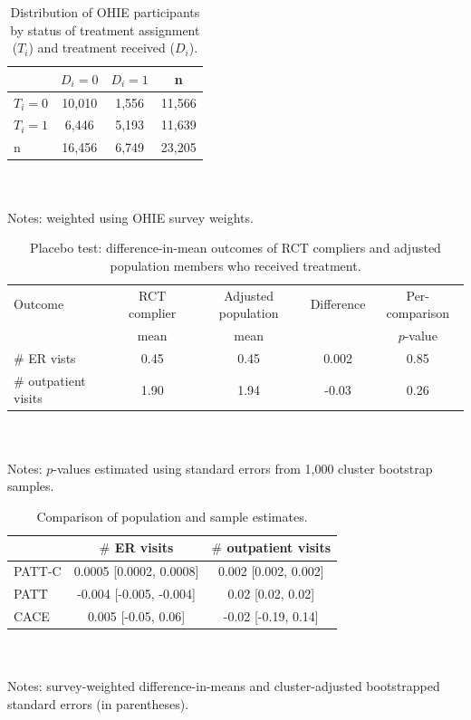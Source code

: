 \documentclass[hidelinks,12pt]{article}
\begin{document}
\begin{appendices}
\begin{table}[h]
	\caption{Distribution of OHIE participants by status of treatment assignment ($T_i$) and treatment received ($D_i$).\label{ohie-status}} 
	\begin{tabular}{@{}lccc@{}}
		\toprule
		& $D_i = 0$ & $D_i = 1$ & n      \\ \midrule
		$T_i = 0$ & 10,010    & 1,556     & 11,566 \\
		$T_i = 1$ & 6,446     & 5,193     & 11,639 \\
		n         & 16,456    & 6,749     & 23,205 \\ \bottomrule
	\end{tabular}\\ \\
	\footnotesize{Notes: weighted using OHIE survey weights.}
\end{table}

\begin{table}[h]
		\caption{Placebo test: difference-in-mean outcomes of RCT compliers and adjusted population members who received treatment.\label{placebo}} 
	\begin{tabular}{@{}lcccc@{}}
		\toprule
		Outcome                & RCT complier & Adjusted population & Difference & Per-comparison \\
				               &  mean 		  & mean 					  & 		   & $p$-value \\		
		 \midrule
		$\#$ ER vists          & 0.45              & 0.45                           & 0.002      & 0.85   \\
		$\#$ outpatient visits & 1.90              & 1.94                           & -0.03      & 0.26   \\ \bottomrule
	\end{tabular}\\ \\
\footnotesize{Notes: $p$-values estimated using standard errors from 1,000 cluster bootstrap samples.}
\end{table}

\begin{table}[h]
	\caption{Comparison of population and sample estimates.\label{compliance-compare}} 
	\begin{tabular}{@{}lcc@{}}
		\toprule
		\backslashbox{Estimator}{Outcome} 				& $\#$ ER visits   & $\#$ outpatient visits      \\ 
		\midrule
		PATT-C                                          & 0.0005 [0.0002, 0.0008]	& 0.002 [0.002, 0.002] \\
		PATT                                            & -0.004 [-0.005, -0.004]	& 0.02 [0.02, 0.02]  \\
		CACE                                            & 0.005 [-0.05, 0.06]	& -0.02 [-0.19, 0.14]  \\ \bottomrule
	\end{tabular}\\ \\
\footnotesize{Notes: survey-weighted difference-in-means and cluster-adjusted bootstrapped standard errors (in parentheses).}
\end{table}


\end{appendices}
\end{document}
